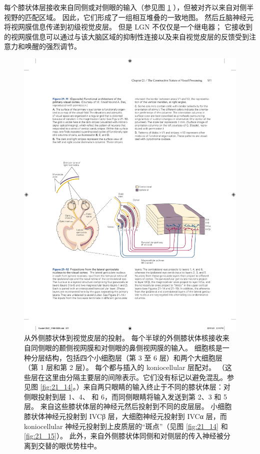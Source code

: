 每个膝状体层接收来自同侧或对侧眼的输入（参见图 \ref{fig:21_12} ），但被对齐以来自对侧半视野的匹配区域。 
因此，它们形成了一组相互堆叠的一致地图。 
然后丘脑神经元将视网膜信息传递到初级视觉皮层。 
但是 LGN 不仅仅是一个继电器； 它接收到的视网膜信息可以通过与该大脑区域的抑制性连接以及来自视觉皮层的反馈受到注意力和唤醒的强烈调节。

\begin{figure}[htbp]
	\centering
	\includegraphics[width=1.0\linewidth]{chap21/fig_21_12}
	\caption{从外侧膝状体到视觉皮层的投射。 
		每个半球的外侧膝状体核接收来自同侧眼的颞侧视网膜和对侧眼的鼻侧视网膜的输入。 
		细胞核是一种分层结构，包括四个小细胞层（第 3 至 6 层）和两个大细胞层（第 1 层和第 2 层）。 
		每个都与插入的 koniocellular 层配对。 （这些层在这里由分隔主要层的间隙表示。它们没有标记以避免混乱。参见图 \ref{fig:21_14}。）来自两只眼睛的输入终止于不同的膝状体层：对侧眼投射到层 1、4、 和 6，而同侧眼睛将输入发送到第 2、3 和 5 层。
		来自这些膝状体层的神经元然后投射到不同的皮层层。 
		小细胞膝状体神经元投射到 IVCβ 层，大细胞神经元投射到 IVCα 层，而 koniocellular 神经元投射到上皮质层的“斑点”（见图 \ref{fig:21_14} 和 \ref{fig:21_15}）。 
		此外，来自外侧膝状体同侧和对侧层的传入神经被分离到交替的眼优势柱中。}
	\label{fig:21_12}
\end{figure}


